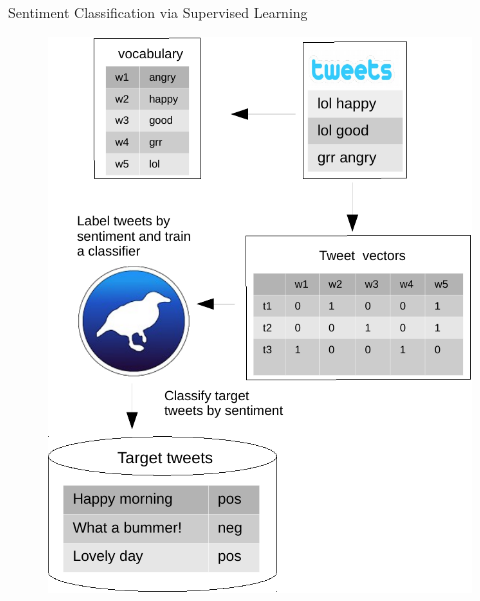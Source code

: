 \documentclass[handout]{beamer}
\begin{document}
\begin{frame}{Sentiment Classification via Supervised Learning}

\begin{figure}[h]
        	\includegraphics[scale = 0.4]{pics/bagOfwordsClassification.pdf}
        \end{figure}

\end{frame}




%
%
%
%
%
%   
%
\end{document}
